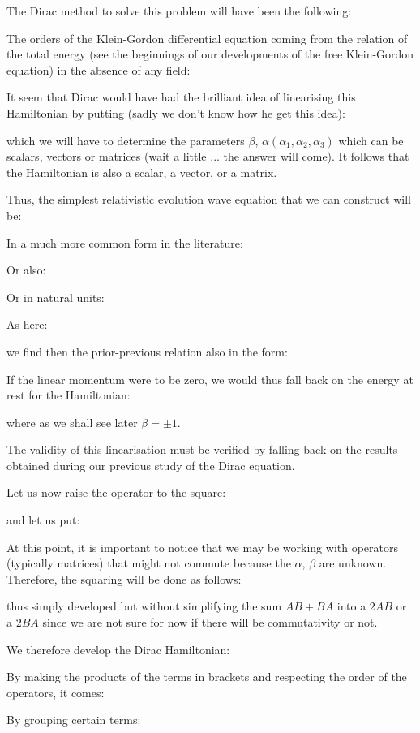 	The Dirac method to solve this problem will have been the following:

	The orders of the Klein-Gordon differential equation coming from the relation  of the total energy (see the beginnings of our developments of the free Klein-Gordon equation) in the absence of any field:
	
	It seem that Dirac would have had the brilliant idea of linearising this Hamiltonian by putting (sadly we don't know how he get this idea):
	
	which we will have to determine the parameters $\beta$, $\alpha(\alpha_1,\alpha_2,\alpha_3)$ which can be scalars, vectors or matrices (wait a little ... the answer will come). It follows that the Hamiltonian is also a scalar, a vector, or a matrix.

	Thus, the simplest relativistic evolution wave equation that we can construct will be:
	
	In a much more common form in the literature:
	
	Or also:
	
	Or in natural units:
	
	As here:
	
	we find then the prior-previous relation also in the form:
	
	If the linear momentum were to be zero, we would thus fall back on the energy at rest for the Hamiltonian:
	
	where as we shall see later $\beta=\pm 1$.
	
	The validity of this linearisation must be verified by falling back on the results obtained during our previous study of the Dirac equation.

	Let us now raise the operator to the square:
	
	and let us put:
	
	At this point, it is important to notice that we may be working with operators (typically matrices) that might not commute because the $\alpha$, $\beta$ are unknown. Therefore, the squaring will be done as follows:
	
	thus simply developed but without simplifying the sum $AB + BA$ into a $2AB$ or a $2BA$ since we are not sure for now if there will be commutativity or not.

	We therefore develop the Dirac Hamiltonian:
	
	By making the products of the terms in brackets and respecting the order of the operators, it comes:
	
	By grouping certain terms:
	

